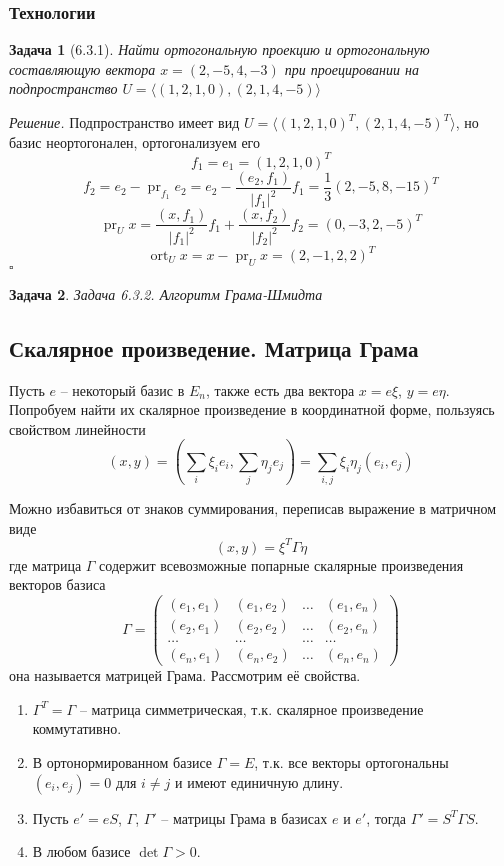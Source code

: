 \documentclass[a4paper,12pt]{article}
\DeclareMathOperator{\pr}{\mathop{pr}}
\DeclareMathOperator{\ort}{\mathop{ort}}
\newtheorem*{prob}{Задача}
\newenvironment{soln}{\noindent\textit{Решение.}}{\hfill$\square$}
\begin{document}
\subsubsection{Технологии}

\begin{prob}[6.3.1]
	Найти ортогональную проекцию  и ортогональную составляющую вектора $x = (2, -5, 4, -3)$ при проецировании на подпространство $U = \langle (1,2,1,0), (2,1,4,-5) \rangle$
\end{prob}
\begin{soln}
	Подпространство имеет вид $U = \langle (1,2,1,0)^T, (2,1,4,-5)^T \rangle$, но базис неортогонален, ортогонализуем его 
	\[f_1 = e_1 = (1,2,1,0)^T \]
	\[
		f_2 = e_2 - \pr_{f_1} e_2 = e_2 - \dfrac{(e_2, f_1)}{|f_1|^2} f_1 = \frac{1}{3} (2, -5, 8, -15)^T
	\]
	\[
		\pr_U x = \dfrac{(x, f_1)}{|f_1|^2}f_1 + \dfrac{(x, f_2)}{|f_2|^2}f_2 = (0,-3,2,-5)^T
	\]
	\[
		\ort_U x = x - \pr_U x = (2, -1, 2, 2)^T
	\]
\end{soln}


\begin{prob}
	Задача 6.3.2. Алгоритм Грама-Шмидта
\end{prob}

\subsection{Скалярное произведение. Матрица Грама}

Пусть $e$ -- некоторый базис в $E_n$, также есть два вектора $x = e\xi$, $y = e\eta$. Попробуем найти их скалярное произведение в координатной форме, пользуясь свойством линейности
\[
	(x,y) = \left( \sum_{i} \xi_i e_i, \sum_{j} \eta_j e_j  \right) = \sum_{i,j} \xi_i \eta_j (e_i, e_j)
\]

Можно избавиться от знаков суммирования, переписав выражение в матричном виде
\[
	(x,y) = \xi^T \Gamma \eta
\]
где матрица $\Gamma$ содержит всевозможные попарные скалярные произведения векторов базиса
\[
	\Gamma = \begin{pmatrix}
		(e_1, e_1) & (e_1, e_2) & \ldots & (e_1, e_n) \\
		(e_2, e_1) & (e_2, e_2) & \ldots & (e_2, e_n) \\
		\ldots     &     \ldots & \ldots & \ldots     \\
		(e_n, e_1) & (e_n, e_2) & \ldots & (e_n, e_n)
	\end{pmatrix}
\]
она называется матрицей Грама. Рассмотрим её свойства.

\begin{enumerate}
	\item $\Gamma^T = \Gamma$ -- матрица симметрическая, т.к. скалярное произведение коммутативно.
	\item В ортонормированном базисе $\Gamma = E$, т.к. все векторы ортогональны $(e_i, e_j) = 0$ для $i \ne j$ и имеют единичную длину.
	\item Пусть $e' = eS$, $\Gamma$, $\Gamma'$ --  матрицы Грама в базисах $e$ и $e'$, тогда $\Gamma' = S^T \Gamma S$. 
	\item В любом базисе $\det \Gamma > 0$.
\end{enumerate}
\end{document}
